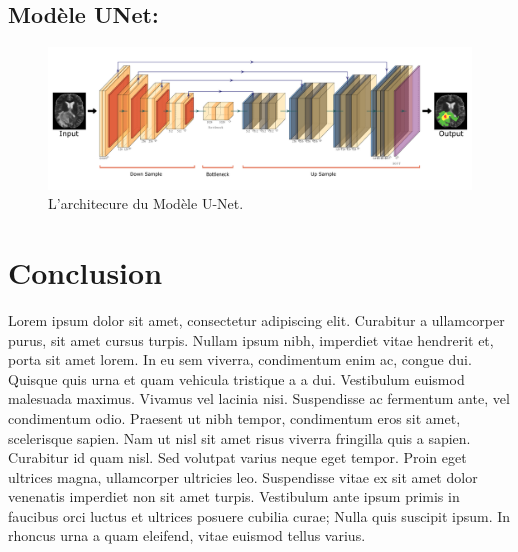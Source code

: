 \subsection{Modèle UNet: }
\begin{figure}[htbp]
\centerline{\includegraphics[scale=.4]{Chapiters/Chapiter_04/Pictures/unet.pdf}}
\caption{L'architecure du Modèle U-Net.}
\label{fig}
\end{figure}

\section{Conclusion}
Lorem ipsum dolor sit amet, consectetur adipiscing elit. Curabitur a ullamcorper purus, sit amet cursus turpis. Nullam ipsum nibh, imperdiet vitae hendrerit et, porta sit amet lorem. In eu sem viverra, condimentum enim ac, congue dui. Quisque quis urna et quam vehicula tristique a a dui. Vestibulum euismod malesuada maximus. Vivamus vel lacinia nisi. Suspendisse ac fermentum ante, vel condimentum odio. Praesent ut nibh tempor, condimentum eros sit amet, scelerisque sapien. Nam ut nisl sit amet risus viverra fringilla quis a sapien. Curabitur id quam nisl. Sed volutpat varius neque eget tempor. Proin eget ultrices magna, ullamcorper ultricies leo. Suspendisse vitae ex sit amet dolor venenatis imperdiet non sit amet turpis. Vestibulum ante ipsum primis in faucibus orci luctus et ultrices posuere cubilia curae; Nulla quis suscipit ipsum. In rhoncus urna a quam eleifend, vitae euismod tellus varius.